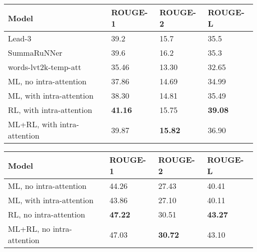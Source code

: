 \documentclass{article} \usepackage{iclr2018_arxiv,times}
\begin{document}
\begin{table*}
\noindent\begin{minipage}{\textwidth}
\centering

\begin{tabular}{|l|l|l|l|}
\hline
{\bf Model} & {\bf ROUGE-1} & {\bf ROUGE-2} & {\bf ROUGE-L}\\\hline
Lead-3 \citep{nallapati2017} & 39.2 & 15.7 & 35.5 \\
SummaRuNNer \citep{nallapati2017} & 39.6 & 16.2 & 35.3 \\\hline
words-lvt2k-temp-att \citep{nallapati2016} & 35.46 & 13.30 & 32.65 \\\hline
ML, no intra-attention & 37.86 & 14.69 & 34.99 \\
ML, with intra-attention & 38.30 & 14.81 & 35.49 \\\hline
RL, with intra-attention & \bf 41.16 & 15.75 & \bf 39.08 \\\hline
ML+RL, with intra-attention & 39.87 & \bf 15.82 & 36.90 \\\hline
\end{tabular}
\label{tab:results-cnndm}

\vspace*{10pt}
\begin{tabular}{|l|l|l|l|}
\hline
{\bf Model} & {\bf ROUGE-1} & {\bf ROUGE-2} & {\bf ROUGE-L}\\\hline
ML, no intra-attention & 44.26 & 27.43 & 40.41 \\
ML, with intra-attention & 43.86 & 27.10 & 40.11 \\\hline
RL, no intra-attention & \bf 47.22 & 30.51 & \bf 43.27 \\\hline
ML+RL, no intra-attention & 47.03 & \bf 30.72 & 43.10 \\\hline
\end{tabular}
\label{tab:results-nyt}



\end{minipage}
\end{table*}
\end{document}
